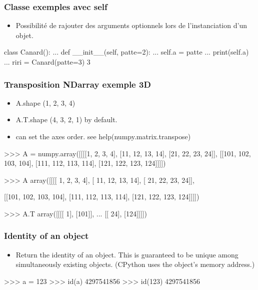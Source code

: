 \begin{frame}[fragile]
\frametitle{Classe exemples avec self}
\begin{itemize}
 \item Possibilité de rajouter des arguments optionnels lors de l'instanciation d'un objet. 
\end{itemize}
\begin{pythonConsole}
class Canard(): 
...     def __init__(self, patte=2):
...             self.a = patte
...             print(self.a)
... 
riri = Canard(patte=3)
3
\end{pythonConsole}
\end{frame}
\begin{frame}[fragile]
\frametitle{Transposition NDarray exemple 3D}
\begin{itemize}
 \item A.shape (1, 2, 3, 4)
 \item A.T.shape (4, 3, 2, 1) by default. 
 \item can set the axes order. see help(numpy.matrix.transpose)
\end{itemize}
\begin{pythonConsole}
>>> A = numpy.array([[[[1, 2, 3, 4], [11, 12, 13, 14], [21, 22, 23, 24]], 
	[[101, 102, 103, 104], [111, 112, 113, 114], [121, 122, 123, 124]]]])

>>> A
array([[[[  1,   2,   3,   4],
         [ 11,  12,  13,  14],
         [ 21,  22,  23,  24]],

        [[101, 102, 103, 104],
         [111, 112, 113, 114],
         [121, 122, 123, 124]]]])

>>> A.T
array([[[[  1],
         [101]],
         ...
        [[ 24],
         [124]]]])
\end{pythonConsole}
\end{frame}
\begin{frame}[fragile]
\frametitle{Identity of an object}
\begin{itemize}
 \item Return the identity of an object.
    This is guaranteed to be unique among simultaneously existing objects.
    (CPython uses the object's memory address.)
\end{itemize}
\begin{pythonConsole}
>>> a = 123
>>> id(a)
4297541856
>>> id(123)
4297541856
\end{pythonConsole}
\end{frame}
